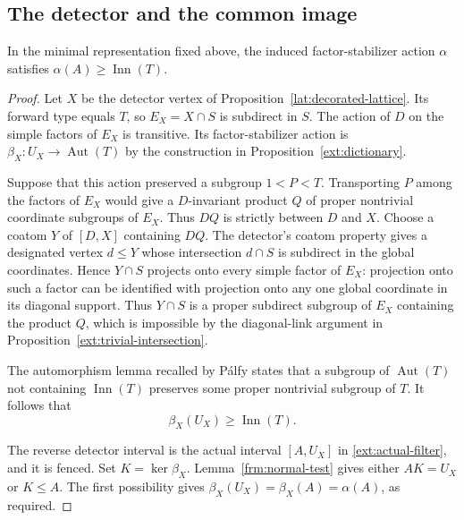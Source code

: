 \subsection{The detector and the common image}

\begin{proposition}\label{ext:detector}
In the minimal representation fixed above, the induced factor-stabilizer
action $\alpha$ satisfies
$\alpha(A)\ge\operatorname{Inn}(T)$.
\end{proposition}
\begin{proof}
Let $X$ be the detector vertex of
Proposition~\ref{lat:decorated-lattice}.  Its forward type equals $T$, so
$E_X=X\cap S$ is subdirect in $S$.  The action of $D$ on the simple
factors of $E_X$ is transitive.  Its factor-stabilizer action is
$\beta_X:U_X\to\operatorname{Aut}(T)$ by the construction in
Proposition~\ref{ext:dictionary}.

Suppose that this action preserved a subgroup $1<P<T$.  Transporting
$P$ among the factors of $E_X$ would give a $D$-invariant product $Q$
of proper nontrivial coordinate subgroups of $E_X$.  Thus $DQ$ is
strictly between $D$ and $X$.  Choose a coatom $Y$ of $[D,X]$ containing
$DQ$.  The detector's coatom property gives a designated vertex
$d\le Y$ whose intersection $d\cap S$ is subdirect in the global
coordinates.  Hence $Y\cap S$ projects onto every simple factor of
$E_X$: projection onto such a factor can be identified with projection
onto any one global coordinate in its diagonal support.
Thus $Y\cap S$ is a proper subdirect subgroup of $E_X$ containing the
product $Q$, which is impossible by the diagonal-link argument in
Proposition~\ref{ext:trivial-intersection}.

The automorphism lemma recalled by P\'alfy
\cite[Lemma~2.11]{PalfyTwisted} states that a subgroup of
$\operatorname{Aut}(T)$ not containing $\operatorname{Inn}(T)$
preserves some proper nontrivial subgroup of $T$.
It follows that
\[
                 \beta_X(U_X)\ge\operatorname{Inn}(T).
\]

The reverse detector interval is the actual interval $[A,U_X]$ in
\eqref{ext:actual-filter}, and it is fenced.  Set $K=\ker\beta_X$.
Lemma~\ref{frm:normal-test} gives either $AK=U_X$ or $K\le A$.
The first possibility gives
$\beta_X(U_X)=\beta_X(A)=\alpha(A)$, as required.


\end{proof}
